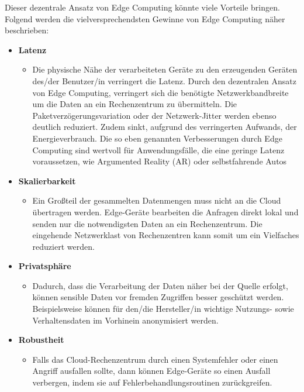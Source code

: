 \documentclass{sigchi}
\begin{document}
Dieser dezentrale Ansatz von Edge Computing könnte viele Vorteile bringen. Folgend werden die vielversprechendsten Gewinne von Edge Computing näher beschrieben: \cite{promise-edge-computing:2016, emergence-edge-computing:2017}

\begin{itemize}
    \item \textbf{Latenz}
     \begin{itemize}
         \item Die physische Nähe der verarbeiteten Geräte zu den erzeugenden Geräten des/der Benutzer/in verringert die Latenz. Durch den dezentralen Ansatz von Edge Computing, verringert sich die benötigte Netzwerkbandbreite um die Daten an ein Rechenzentrum zu übermitteln. Die Paketverzögerungsvariation oder der Netzwerk-Jitter werden ebenso deutlich reduziert. Zudem sinkt, aufgrund des verringerten Aufwands, der Energieverbrauch. Die so eben genannten Verbesserungen durch Edge Computing sind wertvoll für Anwendungsfälle, die eine geringe Latenz voraussetzen, wie Argumented Reality (AR) oder selbstfahrende Autos
     \end{itemize}
    \item \textbf{Skalierbarkeit}
         \begin{itemize}
            \item Ein Großteil der gesammelten Datenmengen muss nicht an die Cloud übertragen werden. Edge-Geräte bearbeiten die Anfragen direkt lokal und senden nur die notwendigsten Daten an ein Rechenzentrum. Die eingehende Netzwerklast von Rechenzentren kann somit um ein Vielfaches reduziert werden.
     \end{itemize}
    \item \textbf{Privatsphäre}
         \begin{itemize}
            \item Dadurch, dass die Verarbeitung der Daten näher bei der Quelle erfolgt, können sensible Daten vor fremden Zugriffen besser geschützt werden. Beispielsweise können für den/die Hersteller/in wichtige Nutzungs- sowie Verhaltensdaten im Vorhinein anonymisiert werden.
     \end{itemize}
    \item \textbf{Robustheit}
         \begin{itemize}
            \item Falls das Cloud-Rechenzentrum durch einen Systemfehler oder einen Angriff ausfallen sollte, dann können Edge-Geräte so einen Ausfall verbergen, indem sie auf Fehlerbehandlungsroutinen zurückgreifen.
        \end{itemize}
\end{itemize}
\end{document}
